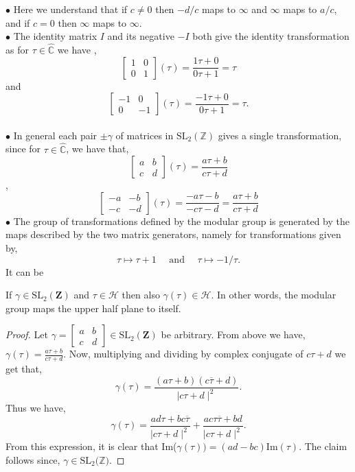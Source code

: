 \begin{remark}
 $\bullet$ Here we understand that if $c \neq 0$ then $-d / c$ maps to $\infty$ and $\infty$ maps to $a / c$, and if $c=0$ then $\infty$ maps to $\infty$. \\
$\bullet$
The identity matrix $I$ and its negative $-I$ both give the identity transformation as for $\tau \in \widehat{\mathbb{C}}$ we have ,
$$
\left[\begin{array}{ll}
1 & 0 \\
0 & 1
\end{array}\right](\tau)=\frac{1 \tau+0}{0 \tau+1}=\tau
$$ and 
$$
\left[\begin{array}{ll}
-1&    0 \\
 0&-1
\end{array}\right](\tau)=\frac{-1 \tau+0}{0 \tau+1}=\tau.
$$ \\
$\bullet$
In  general each pair $\pm \gamma$ of matrices in $\mathrm{SL}_{2}(\mathbb{Z})$ gives a single transformation, since for $\tau \in \widehat{\mathbb{C}}$, we have that, 
$$
\left[\begin{array}{ll}
a & b \\
c & d
\end{array}\right](\tau)=\frac{a \tau+b}{c \tau+d} 
$$,
$$
\left[\begin{array}{ll}
-a & -b \\
-c & -d
\end{array}\right](\tau)=\frac{-a \tau -b}{-c \tau -d}=\frac{a \tau+b}{c \tau+d} 
$$
$\bullet$
The group of transformations defined by the modular group is generated by the maps described by the two matrix generators, namely for transformations given by,  
$$
\tau \mapsto \tau+1 \quad \text { and } \quad \tau \mapsto-1 / \tau.
$$
It can be 

\end{remark}

\begin{proposition}
If $\gamma \in \mathrm{SL}_{2}(\mathbf{Z})$ and $\tau \in \mathcal{H}$ then also $\gamma(\tau) \in \mathcal{H}$. In other words, the modular group maps the upper half plane to itself.

\begin{proof}
Let $\gamma = \left[\begin{array}{ll}
a & b \\
c & d
\end{array}\right] \in \mathrm{SL}_{2}(\mathbf{Z})$ be arbitrary. From above we have, $\gamma(\tau)= \frac{a \tau+b}{c \tau+d}$. Now, multiplying and dividing by complex conjugate of $c\tau+d$ we get that, $$\gamma(\tau)= \frac{(a \tau+b)(c\overline{\tau}+d)}{\mid{c \tau+d}\mid^2}.$$
Thus we have, 
$$\gamma(\tau)= \frac{ad\tau+bc\overline{\tau}}{\mid{c\tau+d}\mid^2}+ \frac{ac\tau\overline{\tau}+bd}{\mid{c \tau+d}\mid^2}. $$
From this expression, it is clear that Im($\gamma(\tau))=(ad-bc)$Im$(\tau).$ 
The claim follows since, $\gamma \in \mathrm{SL_2(\mathbb{{Z})}}.$
\end{proof}
\end{proposition}

